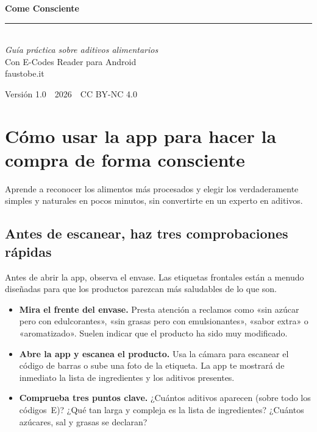 \documentclass[a5paper,12pt,oneside,openany]{book}
\begin{document}
\begin{titlepage}
\pagecolor{verdescuro}
\color{white}
\vspace*{2.5cm}
\begin{center}
  {\fontsize{38}{44}\selectfont\bfseries Come Consciente}\\[1.2cm]
  \textcolor{verdecharo}{\rule{6cm}{0.6pt}}\\[1.2cm]
  {\large\itshape Guía práctica sobre aditivos alimentarios}\\[0.6cm]
  {\normalsize Con E-Codes Reader para Android}\\[3cm]
  {\normalsize\textcolor{verdecharo}{faustobe.it}}
\end{center}
\vfill
\begin{center}
  {\small Versión 1.0\ \textbullet\ 2026\ \textbullet\ CC BY-NC 4.0}
\end{center}
\end{titlepage}
\nopagecolor

\frontmatter
\tableofcontents
\mainmatter

\chapter{Cómo usar la app para hacer la compra de forma consciente}

Aprende a reconocer los alimentos más procesados y elegir los verdaderamente simples
y naturales en pocos minutos, sin convertirte en un experto en aditivos.

\section{Antes de escanear, haz tres comprobaciones rápidas}

Antes de abrir la app, observa el envase. Las etiquetas frontales están a menudo
diseñadas para que los productos parezcan más saludables de lo que son.

\begin{itemize}
  \item \textbf{Mira el frente del envase.} Presta atención a reclamos como
    «sin azúcar pero con edulcorantes», «sin grasas pero con emulsionantes»,
    «sabor extra» o «aromatizado». Suelen indicar que el producto ha sido
    muy modificado.
  \item \textbf{Abre la app y escanea el producto.} Usa la cámara para escanear
    el código de barras o sube una foto de la etiqueta. La app te mostrará de
    inmediato la lista de ingredientes y los aditivos presentes.
  \item \textbf{Comprueba tres puntos clave.} ¿Cuántos aditivos aparecen
    (sobre todo los códigos~E)? ¿Qué tan larga y compleja es la lista de
    ingredientes? ¿Cuántos azúcares, sal y grasas se declaran?
\end{itemize}
\end{document}

